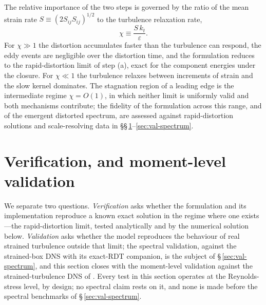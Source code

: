 \documentclass[lineno]{JFM-FLM_Au}
\begin{document}
The relative importance of the two steps is governed by the ratio of the
mean strain rate $S\equiv(2S_{ij}S_{ij})^{1/2}$ to the turbulence
relaxation rate,
\begin{equation}
  \chi \equiv \frac{S\,k_t}{\varepsilon}.
  \label{eq:chi}
\end{equation}
For $\chi\gg1$ the distortion accumulates faster than the turbulence can
respond, the eddy events are negligible over the distortion time, and the
formulation reduces to the rapid-distortion limit of step (a), exact for
the component energies under the closure. For $\chi\ll1$ the turbulence
relaxes between increments of strain and the slow kernel dominates. The
stagnation region of a leading edge is the intermediate regime
$\chi=O(1)$, in which neither limit is uniformly valid and both
mechanisms contribute; the fidelity of the formulation across this range,
and of the emergent distorted spectrum, are assessed against
rapid-distortion solutions and scale-resolving data in
\S\S\,\ref{sec:verification}--\ref{sec:val-spectrum}.

\section{Verification, and moment-level validation}\label{sec:verification}

We separate two questions. \emph{Verification} asks whether the
formulation and its implementation reproduce a known exact solution in
the regime where one exists---the rapid-distortion limit, tested
analytically and by the numerical solution below. \emph{Validation} asks whether the
model reproduces the behaviour of real strained turbulence outside that
limit; the spectral validation, against the strained-box DNS with its
exact-RDT companion, is the subject of \S\,\ref{sec:val-spectrum}, and
this section closes with the moment-level validation against the
strained-turbulence DNS of \citet{LeeReynolds1985}. Every test in this
section operates at the Reynolds-stress level, by design; no spectral
claim rests on it, and none is made before the spectral benchmarks of
\S\,\ref{sec:val-spectrum}.
\end{document}
